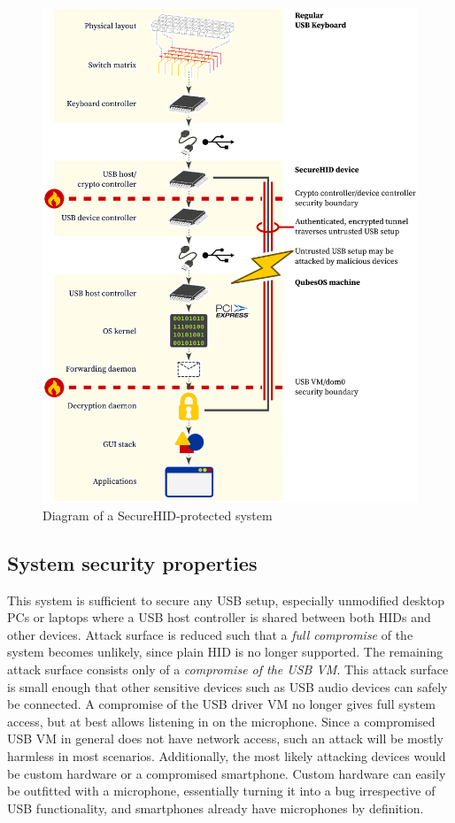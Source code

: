 \documentclass[12pt,a4paper,notitlepage]{article}
\begin{document}
\begin{figure}[p]
    \includegraphics[scale=0.8]{system_diagram_with_secureusb.eps}
    \caption{Diagram of a SecureHID-protected system}
    \label{diagram_with}
\end{figure}

\subsection{System security properties}
This system is sufficient to secure any USB setup, especially unmodified desktop PCs or laptops where a USB host
controller is shared between both HIDs and other devices. Attack surface is reduced such that a \emph{full compromise}
of the system becomes unlikely, since plain HID is no longer supported. The remaining attack surface consists only of a
\emph{compromise of the USB VM}. This attack surface is small enough that other sensitive devices such as USB audio
devices can safely be connected. A compromise of the USB driver VM no longer gives full system access, but at best
allows listening in on the microphone. Since a compromised USB VM in general does not have network access, such an
attack will be mostly harmless in most scenarios. Additionally, the most likely attacking devices would be custom
hardware or a compromised smartphone. Custom hardware can easily be outfitted with a microphone, essentially turning it
into a bug irrespective of USB functionality, and smartphones already have microphones by definition.
\end{document}
